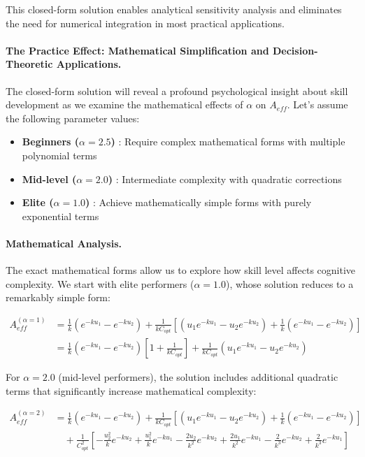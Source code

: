 \documentclass{article}
\begin{document}
This closed-form solution enables analytical sensitivity analysis and eliminates the need for numerical integration 
in most practical applications.

\paragraph{The Practice Effect: Mathematical Simplification and Decision-Theoretic Applications.} The closed-form
solution will reveal a profound psychological insight about skill development as we examine the mathematical effects of
$\alpha$ on $A_{eff}$. Let's assume the following parameter values:

\begin{itemize}
    \item \textbf{Beginners ($\alpha = 2.5$) }: Require complex mathematical forms with multiple polynomial terms
    \item \textbf{Mid-level ($\alpha = 2.0$) }: Intermediate complexity with quadratic corrections
    \item \textbf{Elite ($\alpha = 1.0$) }: Achieve mathematically simple forms with purely exponential terms
\end{itemize}

\paragraph{Mathematical Analysis.} The exact mathematical forms allow us to explore how skill level affects 
cognitive complexity. We start with elite performers ($\alpha = 1.0$), whose solution reduces to a remarkably 
simple form:

\begin{align}
A_{eff}^{(\alpha=1)} &= \frac{1}{k}(e^{-k u_1} - e^{-k u_2}) + \frac{1}{k C_{opt}} \left[ (u_1 e^{-k u_1} - u_2 e^{-k u_2}) + \frac{1}{k}(e^{-k u_1} - e^{-k u_2}) \right] \\
&= \frac{1}{k}(e^{-k u_1} - e^{-k u_2}) \left[ 1 + \frac{1}{k C_{opt}} \right] + \frac{1}{k C_{opt}} (u_1 e^{-k u_1} - u_2 e^{-k u_2})
\end{align}

For $\alpha = 2.0$ (mid-level performers), the solution includes additional quadratic terms that significantly 
increase mathematical complexity:

\begin{align}
A_{eff}^{(\alpha=2)} &= \frac{1}{k}(e^{-k u_1} - e^{-k u_2}) + \frac{1}{k C_{opt}} \left[ (u_1 e^{-k u_1} - u_2 e^{-k u_2}) + \frac{1}{k}(e^{-k u_1} - e^{-k u_2}) \right] \\
&\quad + \frac{1}{C_{opt}^2} \left[ -\frac{u_2^2}{k} e^{-k u_2} + \frac{u_1^2}{k} e^{-k u_1} - \frac{2u_2}{k^2} e^{-k u_2} + \frac{2u_1}{k^2} e^{-k u_1} - \frac{2}{k^3} e^{-k u_2} + \frac{2}{k^3} e^{-k u_1} \right]
\end{align}
\end{document}
